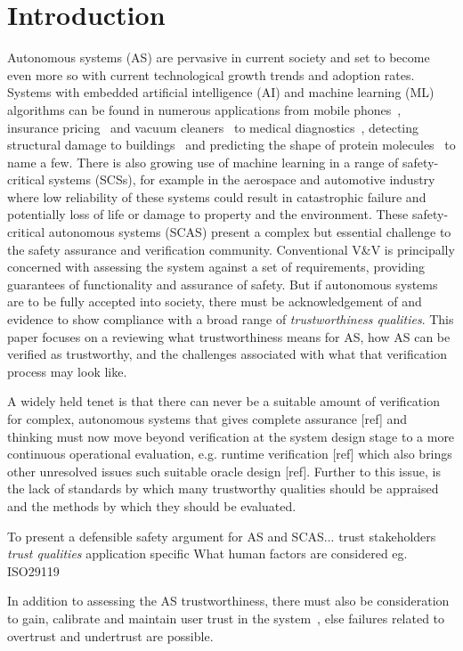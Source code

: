 \section{Introduction}
Autonomous systems (AS) are pervasive in current society and set to become even more so with current technological growth trends and adoption rates. Systems with embedded artificial intelligence (AI) and machine learning (ML) algorithms can be found in numerous applications from mobile phones~\cite{medium_ai_phones}, insurance pricing~\cite{kuo2020towards} and vacuum cleaners~\cite{tf_vacuum} to medical diagnostics~\cite{kononenko2001machine}, detecting structural damage to buildings~\cite{avci2021review} and predicting the shape of protein molecules~\cite{alpha_fold} to name a few. 
%
There is also growing use of machine learning in a range of safety-critical systems (SCSs), for example in the aerospace and automotive industry where low reliability of these systems could result in catastrophic failure and potentially loss of life or damage to property and the environment. These safety-critical autonomous systems (SCAS) present a complex but essential challenge to the safety assurance and verification community. 
%
Conventional V\&V is principally concerned with assessing the system against a set of requirements, providing guarantees of functionality and assurance of safety. But if autonomous systems are to be fully accepted into society, there must be acknowledgement of and evidence to show compliance with a broad range of \emph{trustworthiness qualities}. 
%
This paper focuses on a reviewing what trustworthiness means for AS, how AS can be verified as trustworthy, and the challenges associated with what that verification process may look like. 

A widely held tenet is that there can never be a suitable amount of verification for complex, autonomous systems that gives complete assurance [ref] and thinking must now move beyond verification at the system design stage to a more continuous operational evaluation, e.g. runtime verification [ref] which also brings other unresolved issues such suitable oracle design [ref]. 
%
Further to this issue, is the lack of standards by which many trustworthy qualities should be appraised and the methods by which they should be evaluated.


%
To present a defensible safety argument for AS and SCAS...
trust stakeholders
\emph{trust qualities}
application specific
What human factors are considered eg. ISO29119


In addition to assessing the AS trustworthiness, there must also be consideration to gain, calibrate and maintain user trust in the system~\cite{kok2020trust, Chiou2021}, else failures related to overtrust and undertrust are possible. 



